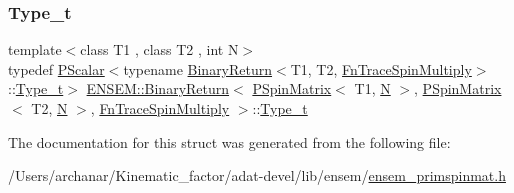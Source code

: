 \subsubsection{\texorpdfstring{Type\_t}{Type\_t}\hspace{0.1cm}{\footnotesize\ttfamily [3/3]}}
{\footnotesize\ttfamily template$<$class T1 , class T2 , int N$>$ \\
typedef \mbox{\hyperlink{classENSEM_1_1PScalar}{P\+Scalar}}$<$typename \mbox{\hyperlink{structENSEM_1_1BinaryReturn}{Binary\+Return}}$<$T1, T2, \mbox{\hyperlink{structENSEM_1_1FnTraceSpinMultiply}{Fn\+Trace\+Spin\+Multiply}}$>$\+::\mbox{\hyperlink{structENSEM_1_1BinaryReturn_3_01PSpinMatrix_3_01T1_00_01N_01_4_00_01PSpinMatrix_3_01T2_00_01N_01fe1ad0c4fbb2ea3b6d703682cfed6045_a66286a845d3a1b506d5d5116c7e3e2a1}{Type\+\_\+t}}$>$ \mbox{\hyperlink{structENSEM_1_1BinaryReturn}{E\+N\+S\+E\+M\+::\+Binary\+Return}}$<$ \mbox{\hyperlink{classENSEM_1_1PSpinMatrix}{P\+Spin\+Matrix}}$<$ T1, \mbox{\hyperlink{adat__devel_2lib_2hadron_2operator__name__util_8cc_a7722c8ecbb62d99aee7ce68b1752f337}{N}} $>$, \mbox{\hyperlink{classENSEM_1_1PSpinMatrix}{P\+Spin\+Matrix}}$<$ T2, \mbox{\hyperlink{adat__devel_2lib_2hadron_2operator__name__util_8cc_a7722c8ecbb62d99aee7ce68b1752f337}{N}} $>$, \mbox{\hyperlink{structENSEM_1_1FnTraceSpinMultiply}{Fn\+Trace\+Spin\+Multiply}} $>$\+::\mbox{\hyperlink{structENSEM_1_1BinaryReturn_3_01PSpinMatrix_3_01T1_00_01N_01_4_00_01PSpinMatrix_3_01T2_00_01N_01fe1ad0c4fbb2ea3b6d703682cfed6045_a66286a845d3a1b506d5d5116c7e3e2a1}{Type\+\_\+t}}}



The documentation for this struct was generated from the following file\+:\begin{DoxyCompactItemize}
\item 
/\+Users/archanar/\+Kinematic\+\_\+factor/adat-\/devel/lib/ensem/\mbox{\hyperlink{adat-devel_2lib_2ensem_2ensem__primspinmat_8h}{ensem\+\_\+primspinmat.\+h}}\end{DoxyCompactItemize}
